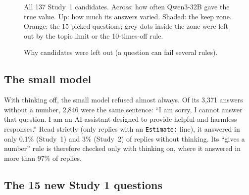 \documentclass[11pt,a4paper]{article}
\begin{document}
\begin{figure}[ht]
\centering{}
\caption{All 137 Study~1 candidates. Across: how often Qwen3-32B gave the true value. Up: how much its answers varied. Shaded: the keep zone. Orange: the 15 picked questions; grey dots inside the zone were left out by the topic limit or the 10-times-off rule.}
\label{fig:s1screen}
\end{figure}

\begin{figure}[ht]
\centering{}
\caption{Why candidates were left out (a question can fail several rules).}
\label{fig:reasons}
\end{figure}

\subsection{The small model}
With thinking off, the small model refused almost always. Of its 3,371 answers without a number, 2,846 were the same sentence: \enquote{I am sorry, I cannot answer that question. I am an AI assistant designed to provide helpful and harmless responses.} Read strictly (only replies with an \texttt{Estimate:} line), it answered in only 0.1\% (Study~1) and 3\% (Study~2) of replies without thinking. Its \enquote{gives a number} rule is therefore checked only with thinking on, where it answered in more than 97\% of replies.

\subsection{The 15 new Study 1 questions}
\end{document}
